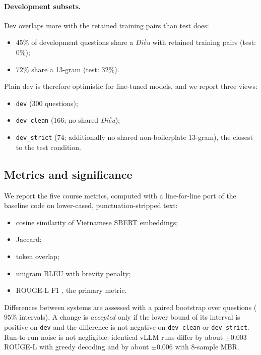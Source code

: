 \documentclass[11pt,a4paper]{article}
\newcommand{\rl}{ROUGE-L}
\newcommand{\dieu}{\textit{Điều}}
\begin{document}
\paragraph{Development subsets.}
Dev overlaps more with the retained training pairs than test does:
\begin{itemize}[leftmargin=*]
\item $45\%$ of development questions share a \dieu{} with retained training pairs (test: $0\%$);
\item $72\%$ share a 13-gram (test: $32\%$).
\end{itemize}
Plain dev is therefore optimistic for fine-tuned models, and we report three views:
\begin{itemize}[leftmargin=*]
\item \texttt{dev} ($300$ questions);
\item \texttt{dev\_clean} ($166$; no shared \dieu);
\item \texttt{dev\_strict} ($74$; additionally no shared non-boilerplate 13-gram), the closest to the test condition.
\end{itemize}

\subsection{Metrics and significance}
We report the five course metrics, computed with a line-for-line port of the baseline code on lower-cased, punctuation-stripped text:
\begin{itemize}[leftmargin=*]
\item cosine similarity of Vietnamese SBERT embeddings;
\item Jaccard;
\item token overlap;
\item unigram BLEU with brevity penalty;
\item \rl{} F1 \cite{rouge}, the primary metric.
\end{itemize}
Differences between systems are assessed with a paired bootstrap over questions \cite{bootstrap,bergk} ($95\%$ intervals). A change is \emph{accepted} only if the lower bound of its interval is positive on \texttt{dev} and the difference is not negative on \texttt{dev\_clean} or \texttt{dev\_strict}. Run-to-run noise is not negligible: identical vLLM runs differ by about $\pm0.003$ \rl{} with greedy decoding and by about $\pm0.006$ with $8$-sample MBR.
\end{document}
